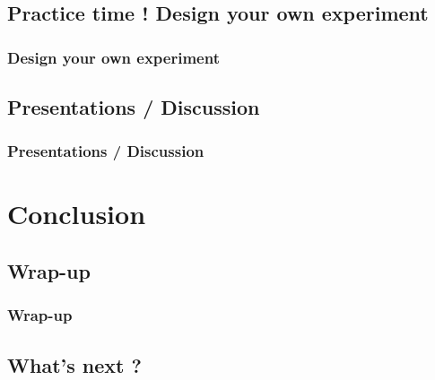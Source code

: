 \documentclass[xcolor=dvipsnames,english]{beamer}
\begin{document}
\subsection{Practice time ! Design your own experiment}

\begin{frame}
  \frametitle{Design your own experiment}
\end{frame}

\subsection{Presentations / Discussion}

\begin{frame}
  \frametitle{Presentations / Discussion}
\end{frame}


\section{Conclusion}
\subsection{Wrap-up}

\begin{frame}
  \frametitle{Wrap-up}
\end{frame}

\subsection{What's next ?}
\end{document}
